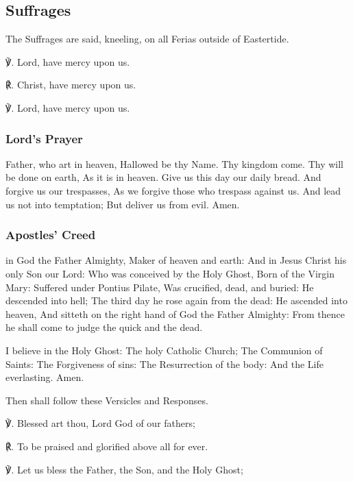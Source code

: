 \begin{multicols}{2}
\subsection{Suffrages}
\begin{rubric}
	The Suffrages are said, kneeling, on all Ferias outside of Eastertide.
\end{rubric}
℣. Lord, have mercy upon us.

℟. Christ, have mercy upon us.

℣. Lord, have mercy upon us.

\subsubsection{Lord's Prayer}
 Father, who art in heaven, Hallowed be thy Name. Thy kingdom come. Thy will be done on earth, As it is in heaven. Give us this day our daily bread. And forgive us our trespasses, As we forgive those who trespass against us. And lead us not into temptation; But deliver us from evil. Amen.

\subsubsection{Apostles' Creed}
 in God the Father Almighty, Maker of heaven and earth:
    And in Jesus Christ his only Son our Lord: Who was conceived by the Holy Ghost, Born of the Virgin Mary: Suffered under Pontius Pilate, Was crucified, dead, and buried: He descended into hell; The third day he rose again from the dead: He ascended into heaven, And sitteth on the right hand of God the Father Almighty: From thence he shall come to judge the quick and the dead.\par
    I believe in the Holy Ghost: The holy Catholic Church; The Communion of Saints: The Forgiveness of sins: The Resurrection of the body: {} And the Life everlasting. Amen.

\begin{rubric}
	Then shall follow these Versicles and Responses.
\end{rubric}
℣. Blessed art thou, Lord God of our fathers;

℟. To be praised and glorified above all for ever.

℣. Let us bless the Father, the Son, and the Holy Ghost;


\end{multicols}
